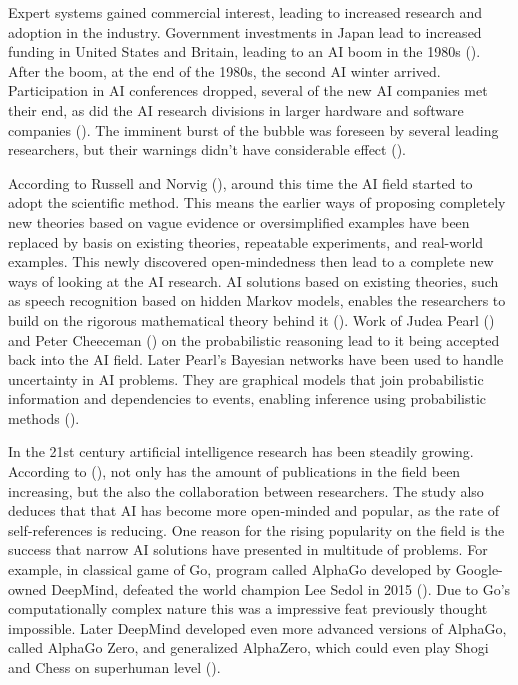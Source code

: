 \documentclass[utf8,english]{gradu3}
\begin{document}
Expert systems gained commercial interest, leading to increased research and adoption in the industry. Government investments in Japan lead to increased funding in United States and Britain, leading to an AI boom in the 1980s (\cite{norvig2002}). After the boom, at the end of the 1980s, the second AI winter arrived. Participation in AI conferences dropped, several of the new AI companies met their end, as did the AI research divisions in larger hardware and software companies (\cite{nilsson2009}). The imminent burst of the bubble was foreseen by several leading researchers, but their warnings didn't have considerable effect (\cite{nilsson2009}).

According to Russell and Norvig (\cite*{norvig2002}), around this time the AI field started to adopt the scientific method. This means the earlier ways of proposing completely new theories based on vague evidence or oversimplified examples have been replaced by basis on existing theories, repeatable experiments, and real-world examples.
This newly discovered open-mindedness then lead to a complete new ways of looking at the AI research. AI solutions based on existing theories, such as speech recognition based on hidden Markov models, enables the researchers to build on the rigorous mathematical theory behind it (\cite{norvig2002}).
Work of Judea Pearl (\cite*{pearl1988}) and Peter Cheeceman (\cite*{cheeseman1985}) on the probabilistic reasoning lead to it being accepted back into the AI field. Later Pearl's Bayesian networks have been used to handle uncertainty in AI problems. They are graphical models that join probabilistic information and dependencies to events, enabling inference using probabilistic methods (\cite{goertzel2007}).



In the 21st century artificial intelligence research has been steadily growing. According to (\cite{liu2018}), not only has the amount of publications in the field been increasing, but the also the collaboration between researchers. The study also deduces that that AI has become more open-minded and popular, as the rate of self-references is reducing. One reason for the rising popularity on the field is the success that narrow AI solutions have presented in multitude of problems. For example, in classical game of Go, program called AlphaGo developed by Google-owned DeepMind, defeated the world champion Lee Sedol in 2015 (\cite{silver2016}). Due to Go's computationally complex nature this was a impressive feat previously thought impossible. Later DeepMind developed even more advanced versions of AlphaGo, called AlphaGo Zero, and generalized AlphaZero, which could even play Shogi and Chess on superhuman level (\cite{silver2018}).
\end{document}
